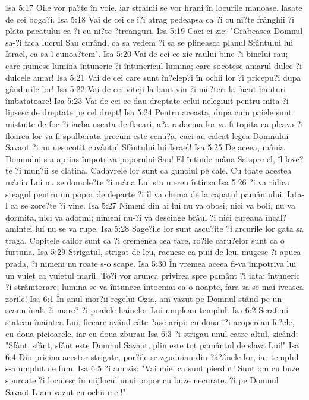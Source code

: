 Isa 5:17  Oile vor pa?te în voie, iar strainii se vor hrani în locurile manoase, lasate de cei boga?i.
Isa 5:18  Vai de cei ce î?i atrag pedeapsa ca ?i cu ni?te frânghii ?i plata pacatului ca ?i cu ni?te ?treanguri,
Isa 5:19  Caci ei zic: "Grabeasca Domnul sa-?i faca lucrul Sau curând, ca sa vedem ?i sa se plineasca planul Sfântului lui Israel, ca sa-l cunoa?tem".
Isa 5:20  Vai de cei ce zic raului bine ?i binelui rau; care numesc lumina întuneric ?i întunericul lumina; care socotesc amarul dulce ?i dulcele amar!
Isa 5:21  Vai de cei care sunt în?elep?i în ochii lor ?i pricepu?i dupa gândurile lor!
Isa 5:22  Vai de cei viteji la baut vin ?i me?teri la facut bauturi îmbatatoare!
Isa 5:23  Vai de cei ce dau dreptate celui nelegiuit pentru mita ?i lipsesc de dreptate pe cel drept!
Isa 5:24  Pentru aceasta, dupa cum paiele sunt mistuite de foc ?i iarba uscata de flacari, a?a radacina lor va fi topita ca pleava ?i floarea lor va fi spulberata precum este cenu?a, caci au calcat legea Domnului Savaot ?i au nesocotit cuvântul Sfântului lui Israel!
Isa 5:25  De aceea, mânia Domnului s-a aprins împotriva poporului Sau! El întinde mâna Sa spre el, îl love?te ?i mun?ii se clatina. Cadavrele lor sunt ca gunoiul pe cale. Cu toate acestea mânia Lui nu se domole?te ?i mâna Lui sta mereu întinsa
Isa 5:26  ?i va ridica steagul pentru un popor de departe ?i îl va chema de la capatul pamântului. Iata-l ca se zore?te ?i vine.
Isa 5:27  Nimeni din ai lui nu va obosi, nici va boli, nu va dormita, nici va adormi; nimeni nu-?i va descinge brâul ?i nici cureaua încal?amintei lui nu se va rupe.
Isa 5:28  Sage?ile lor sunt ascu?ite ?i arcurile lor gata sa traga. Copitele cailor sunt ca ?i cremenea cea tare, ro?ile caru?elor sunt ca o furtuna.
Isa 5:29  Strigatul, strigat de leu, racnesc ca puii de leu, mugesc ?i apuca prada, ?i nimeni nu roate s-o scape.
Isa 5:30  În vremea aceea fi-va împotriva lui un vuiet ca vuietul marii. To?i vor arunca privirea spre pamânt ?i iata: întuneric ?i strâmtorare; lumina se va întuneca întocmai ca o noapte, fara sa se mai iveasca zorile!
Isa 6:1  În anul mor?ii regelui Ozia, am vazut pe Domnul stând pe un scaun înalt ?i mare? ?i poalele hainelor Lui umpleau templul.
Isa 6:2  Serafimi stateau înaintea Lui, fiecare având câte ?ase aripi: cu doua î?i acopereau fe?ele, cu doua picioarele, iar cu doua zburau
Isa 6:3  ?i strigau unul catre altul, zicând: "Sfânt, sfânt, sfânt este Domnul Savaot, plin este tot pamântul de slava Lui!"
Isa 6:4  Din pricina acestor strigate, por?ile se zguduiau din ?â?ânele lor, iar templul s-a umplut de fum.
Isa 6:5  ?i am zis: "Vai mie, ca sunt pierdut! Sunt om cu buze spurcate ?i locuiesc în mijlocul unui popor cu buze necurate. ?i pe Domnul Savaot L-am vazut cu ochii mei!"
